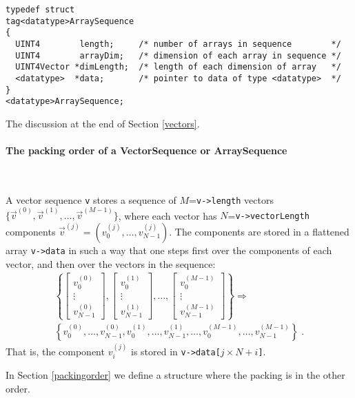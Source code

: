 \documentclass[]{ligodcc}
\begin{document}
{\footnotesize
\begin{verbatim}
typedef struct
tag<datatype>ArraySequence
{
  UINT4        length;     /* number of arrays in sequence        */
  UINT4        arrayDim;   /* dimension of each array in sequence */
  UINT4Vector *dimLength;  /* length of each dimension of array   */
  <datatype>  *data;       /* pointer to data of type <datatype>  */
}
<datatype>ArraySequence;
\end{verbatim}}

\noindent
The discussion at the end of Section \ref{vectors}.

\paragraph{The packing order of a VectorSequence or ArraySequence}~
\label{packingorderAS}

\noindent A vector sequence {\tt v} stores a sequence of
$M$={\tt v->length} vectors
$\{\vec{v}^{(0)},\vec{v}^{(1)},\ldots,\vec{v}^{(M-1)}\}$, where each
vector has $N$={\tt v->vectorLength} components
$\vec{v}^{(j)}=(v^{(j)}_0,\ldots,v^{(j)}_{N-1})$.  The components are
stored in a flattened array {\tt v->data} in such a way that one
steps first over the components of each vector, and then over the
vectors in the sequence:
\begin{eqnarray}
\left\{
\left[\begin{array}{c} v^{(0)}_0 \\ \vdots \\ v^{(0)}_{N-1} \end{array}\right],
\left[\begin{array}{c} v^{(1)}_0 \\ \vdots \\ v^{(1)}_{N-1} \end{array}\right],
\ldots ,
\left[\begin{array}{c}
v^{(M-1)}_0 \\ \vdots \\ v^{(M-1)}_{N-1} \end{array}\right]
\right\} \Longrightarrow \nonumber\\
\left\{ v^{(0)}_0, \ldots, v^{(0)}_{N-1}, v^{(1)}_0, \ldots, v^{(1)}_{N-1},
\ldots, v^{(M-1)}_0, \ldots, v^{(M-1)}_{N-1} \right\} \; .
\end{eqnarray}
That is, the component $v^{(j)}_i$ is stored in
{\tt v->data[}$j\times N+i${\tt ]}.

In Section \ref{packingorder} we define a structure where the packing
is in the other order.
\end{document}
